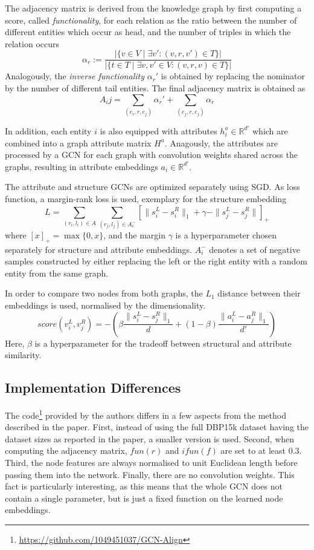 \documentclass[runningheads]{llncs}
\begin{document}
The adjacency matrix is derived from the knowledge graph by first computing a score, called \emph{functionality}, for each relation as the ratio between the number of different entities which occur as head, and the number of triples in which the relation occurs
$$
\alpha_r := \frac{|\{v \in V \mid \exists v': (v, r, v') \in T\}|}{|\{t \in T \mid \exists v, v' \in V: (v, r, v) \in T\}|}
$$
Analogously, the \emph{inverse functionality} $\alpha_r'$ is obtained by replacing the nominator by the number of different tail entities.
The final adjacency matrix is obtained as
$$
A_ij = \sum \limits_{(e_i, r, e_j)} \alpha_r' + \sum \limits_{(e_j, r, e_j)} \alpha_r
$$

In addition, each entity $i$ is also equipped with attributes $h_i^a \in \mathbb{R}^{d'}$ which are combined into a graph attribute matrix $H^a$.
Anagously, the attributes are processed by a GCN for each graph with convolution weights shared across the graphs, resulting in attribute embeddings $a_i \in \mathbb{R}^{d'}$.

The attribute and structure GCNs are optimized separately using SGD.
As loss function, a margin-rank loss is used, exemplary for the structure embedding
$$
L = \sum \limits_{(r_i, l_i) \in A} \sum \limits_{(r_j, l_j) \in A_i^-} \left[\|s_i^L - s_i^R\|_1 + \gamma - \|s_j^L - s_j^R\|\right]_{+}
$$
where $[x]_+ = \max \{0, x\}$, and the margin $\gamma$ is a hyperparameter chosen separately for structure and attribute embeddings.
$A_i^-$ denotes a set of negative samples constructed by either replacing the left or the right entity with a random entity from the same graph.


In order to compare two nodes from both graphs, the $L_1$ distance between their embeddings is used, normalised by the dimensionality.
$$
score(v_i^L, v_j^R) = - \left(\beta \frac{\|s_i^L - s_j^R\|_1}{d} + (1 - \beta) \frac{\|a_i^L - a_j^R\|_1}{d'} \right)
$$
Here, $\beta$ is a hyperparameter for the tradeoff between structural and attribute similarity.

\subsection{Implementation Differences}
The code\footnote{\url{https://github.com/1049451037/GCN-Align}} provided by the authors differs in a few aspects from the method described in the paper.
First, instead of using the full DBP15k dataset having the dataset sizes as reported in the paper, a smaller version is used.
Second, when computing the adjacency matrix, $fun(r)$ and $ifun(f)$ are set to at least 0.3.
Third, the node features are always normalised to unit Euclidean length before passing them into the network.
Finally, there are no convolution weights.
This fact is particularly interesting, as this means that the whole GCN does not contain a single parameter, but is just a fixed function on the learned node embeddings. 
\end{document}
